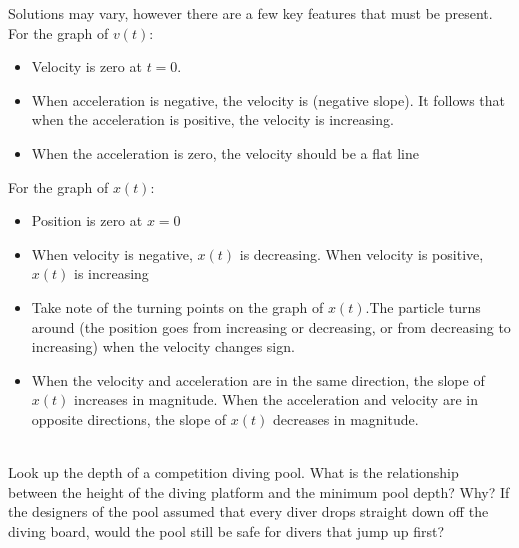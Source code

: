 Solutions may vary, however there are a few key features that must be present.\\
For the graph of $v(t)$:
\begin{itemize}
\item Velocity is zero at $t=0$.
\item When acceleration is negative, the velocity is (negative slope). It follows that when the acceleration is positive, the velocity is increasing. 
\item When the acceleration is zero, the velocity should be a flat line
\end{itemize}
For the graph of $x(t)$:
\begin{itemize}
\item Position is zero at $x=0$
\item When velocity is negative, $x(t)$ is decreasing. When velocity is positive, $x(t)$ is increasing
\item Take note of the turning points on the graph of $x(t)$.The particle turns around (the position goes from increasing or decreasing, or from decreasing to increasing) when the velocity changes sign. 
\item When the velocity and acceleration are in the same direction, the slope of $x(t)$ increases in magnitude. When the acceleration and velocity are in opposite directions, the slope of $x(t)$ decreases in magnitude. 
\end{itemize}

\begin{reflectresearch}\\
Look up the depth of a competition diving pool. What is the relationship between the height of the diving platform and the minimum pool depth? Why? If the designers of the pool assumed that every diver drops straight down off the diving board, would the pool still be safe for divers that jump up first?
\end{reflectresearch}
